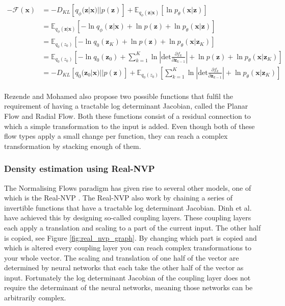 \documentclass{article}
\newcommand{\E}{\mathbb{E}}
\newcommand{\bx}{\mathbf{x}}
\newcommand{\bz}{\mathbf{z}}
\newcommand{\parfrac}[2]{\frac{\partial #1}{\partial#2}}
\begin{document}
\begin{equation}\label{equation:negative_free_energy_with_flow}
    \begin{split}
    -\mathcal{F}(\bx) &= -D_{KL}[q_\phi(\bz|\bx) || p(\bz)] + \E_{q_\phi(\bz|\bx)}[\ln p_\theta(\bx|\bz)]\\
    &= \E_{q_\phi(\bz|\bx)}[-\ln q_\phi(\bz|\bx) + \ln p(\bz) + \ln p_\theta(\bx|\bz)]\\
    &= \E_{q_0(z_0)}[-\ln q_0(\bz_K) + \ln p(\bz) + \ln p_\theta(\bx|\bz_K)]\\
    &= \E_{q_0(z_0)}[-\ln q_0(\bz_0) + \sum\limits^K_{k=1}\ln \left|\text{det} \parfrac{f_k}{\bz_{k-1}} \right| + \ln p(\bz) + \ln p_\theta(\bx|\bz_K)]\\
    &= -D_{KL}[q_0(\bz_0|\bx) || p(\bz)]+   \E_{q_0(z_0)}[\sum\limits^K_{k=1}\ln \left|\text{det} \parfrac{f_k}{\bz_{k-1}} \right| + \ln p_\theta(\bx|\bz_K)]\\
    \end{split}
\end{equation}

\noindent
Rezende and Mohamed also propose two possible functions that fulfil the requirement of having a tractable log determinant Jacobian, called the Planar Flow and Radial Flow. Both these functions consist of a residual connection to which a simple transformation to the input is added. Even though both of these flow types apply a small change per function, they can reach a complex transformation by stacking enough of them.



\subsubsection*{Density estimation using Real-NVP}
The Normalising Flows paradigm has given rise to several other models, one of which is the Real-NVP \cite{dinh2016density}. The Real-NVP also work by chaining a series of invertible functions that have a tractable log determinant Jacobian. Dinh et al. have achieved this by designing so-called coupling layers. These coupling layers each apply a translation and scaling to a part of the current input. The other half is copied, see Figure \ref{fig:real_nvp_graph}. By changing which part is copied and which is altered every coupling layer you can reach complex transformations to your whole vector. The scaling and translation of one half of the vector are determined by neural networks that each take the other half of the vector as input. Fortunately the log determinant Jacobian of the coupling layer does not require the determinant of the neural networks, meaning those networks can be arbitrarily complex.
\end{document}
